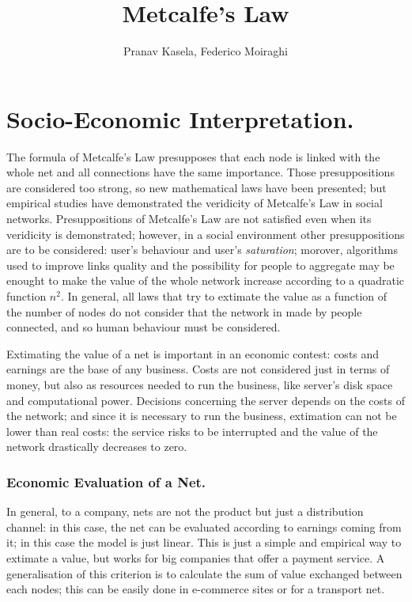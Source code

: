 \documentclass[12pt, a4page]{article}
\title{Metcalfe's Law}
\date{}
\author{Pranav Kasela, Federico Moiraghi}
\begin{document}
\maketitle

\part*{Socio-Economic Interpretation.}
The formula of Metcalfe's Law presupposes that each node is linked with the whole net and all connections have the same importance.
Those presuppositions are considered too strong, so new mathematical laws have been presented; but empirical studies have demonstrated the veridicity of Metcalfe's Law in social networks. \newline
Presuppositions of Metcalfe's Law are not satisfied even when its veridicity is demonstrated; however, in a social environment other presuppositions are to be considered: user's behaviour and user's \textit{saturation}; morover, algorithms used to improve links quality and the possibility for people to aggregate may be enought to make the value of the whole network increase according to a quadratic function $n^2$. \newline
In general, all laws that try to extimate the value as a function of the number of nodes do not consider that the network in made by people connected, and so human behaviour must be considered. \newline

Extimating the value of a net is important in an economic contest: costs and earnings are the base of any business. Costs are not considered just in terms of money, but also as resources needed to run the business, like server's disk space and computational power.
Decisions concerning the server depends on the costs of the network; and since it is necessary to run the business, extimation can not be lower than real costs: the service risks to be interrupted and the value of the network drastically decreases to zero. \newline

\section{Economic Evaluation of a Net.}
In general, to a company, nets are not the product but just a distribution channel: in this case, the net can be evaluated according to earnings coming from it; in this case the model is just linear.
This is just a simple and empirical way to extimate a value, but works for big companies that offer a payment service. \newline
A generalisation of this criterion is to calculate the sum of value exchanged between each nodes; this can be easily done in e-commerce sites or for a transport net. \newline%
\end{document}
